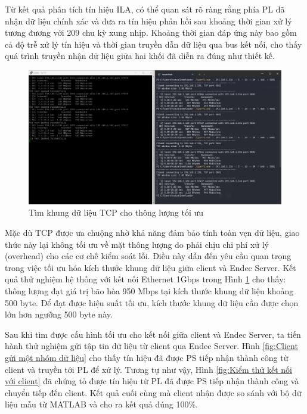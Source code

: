 \documentclass[../DoAn.tex]{subfiles}
\begin{document}
Từ kết quả phân tích tín hiệu ILA, có thể quan sát rõ ràng rằng phía PL đã nhận dữ liệu chính xác và đưa ra tín hiệu phản hồi sau khoảng thời gian xử lý tương đương với 209 chu kỳ xung nhịp. Khoảng thời gian đáp ứng này bao gồm cả độ trễ xử lý tín hiệu và thời gian truyền dẫn dữ liệu qua bus kết nối, cho thấy quá trình truyền nhận dữ liệu giữa hai khối đã diễn ra đúng như thiết kế.

\begin{figure}[H]
    \centering
    \includegraphics[width=\textwidth, height=0.4\textheight, keepaspectratio]{Hinhve/Chuong 4/tcp throughput.png}
    \caption{Tìm khung dữ liệu TCP cho thông lượng tối ưu}
    \label{fig:Tìm số dữ liệu tối ưu cho thông lượng}
\end{figure}

Mặc dù TCP được ưa chuộng nhờ khả năng đảm bảo tính toàn vẹn dữ liệu, giao thức này lại không tối ưu về mặt thông lượng do phải chịu chi phí xử lý (overhead) cho các cơ chế kiểm soát lỗi. Điều này dẫn đến yêu cầu quan trọng trong việc tối ưu hóa kích thước khung dữ liệu giữa client và Endec Server. Kết quả thử nghiệm hệ thống với kết nối Ethernet 1Gbps trong Hình \ref{fig:Tìm số dữ liệu tối ưu cho thông lượng} cho thấy: thông lượng đạt giá trị bão hòa 950 Mbps tại kích thước khung dữ liệu khoảng 500 byte. Để đạt được hiệu suất tối ưu, kích thước khung dữ liệu cần được chọn lớn hơn ngưỡng 500 byte này.

Sau khi tìm được cấu hình tối ưu cho kết nối giữa client và Endec Server, ta tiến hành thử nghiệm gửi tập tin dữ liệu từ client qua Endec Server. Hình \ref{fig:Client gửi một nhóm dữ liệu} cho thấy tín hiệu đã được PS tiếp nhận thành công từ client và truyền tới PL để xử lý. Tương tự như vậy, Hình \ref{fig:Kiểm thử kết nối với client} đã chứng tỏ được tín hiệu từ PL đã được PS tiếp nhận thành công và chuyển tiếp đến client. Kết quả cuối cùng mà client nhận được so sánh với bộ dữ liệu mẫu từ MATLAB và cho ra kết quả đúng 100\%.
\end{document}
